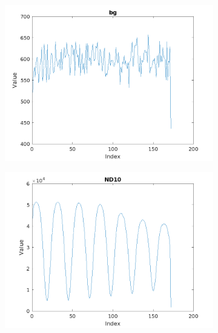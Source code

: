 \documentclass{article}
\numberwithin{equation}{section}
\begin{document}
\begin{figure}[h]
    \centering
    \begin{subfigure}[b]{0.45\textwidth}
        \includegraphics[width=\textwidth]{bg.png}
    \end{subfigure}
    \hfill
    \begin{subfigure}[b]{0.45\textwidth}
        \includegraphics[width=\textwidth]{ND10.png}
    \end{subfigure}
    \
    \begin{subfigure}[b]{0.45\textwidth}

\end{subfigure}
\end{figure}
\end{document}

